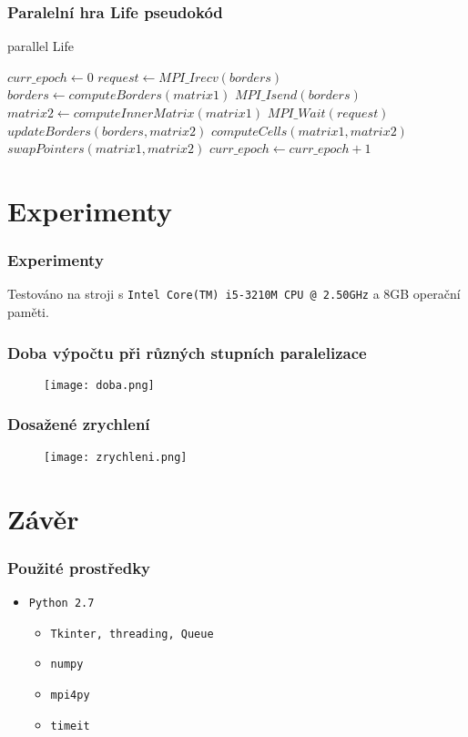 \documentclass{beamer}
\begin{document}
\begin{frame}
\frametitle{Paralelní hra Life pseudokód}
  \begin{algorithm}[H]
  \caption{parallel Life}
  \begin{algorithmic}[1]
    \State $curr\_epoch \leftarrow 0$
      \State $request \leftarrow MPI\_Irecv(borders)$
      \State $borders \leftarrow computeBorders(matrix1)$
      \State $MPI\_Isend(borders)$
      \State $matrix2 \leftarrow computeInnerMatrix(matrix1)$
      \State $MPI\_Wait(request)$
      \State $updateBorders(borders, matrix2)$
      \State $computeCells(matrix1, matrix2)$
      \State $swapPointers(matrix1, matrix2)$
      \State $curr\_epoch \leftarrow curr\_epoch + 1$
    \EndWhile
  \end{algorithmic}
  \end{algorithm}
\end{frame}

\section{Experimenty}

\begin{frame}
\frametitle{Experimenty}
Testováno na stroji s \texttt{Intel Core(TM) i5-3210M CPU @ 2.50GHz} a 8GB operační paměti.
\end{frame}

\begin{frame}
\frametitle{Doba výpočtu při různých stupních paralelizace}
\begin{figure}
    \centering
    \texttt{[image: doba.png]}
\end{figure}
\end{frame}

\begin{frame}
\frametitle{Dosažené zrychlení}
\begin{figure}
    \centering
    \texttt{[image: zrychleni.png]}
\end{figure}
\end{frame}

\section{Závěr}

\begin{frame}
\frametitle{Použité prostředky}
\begin{itemize}
  \item \texttt{Python 2.7}
  \begin{itemize}
    \item \texttt{Tkinter, threading, Queue}
    \item \texttt{numpy}
    \item \texttt{mpi4py}
    \item \texttt{timeit}    
  \end{itemize}
\end{itemize}
\end{frame}
\end{document}

